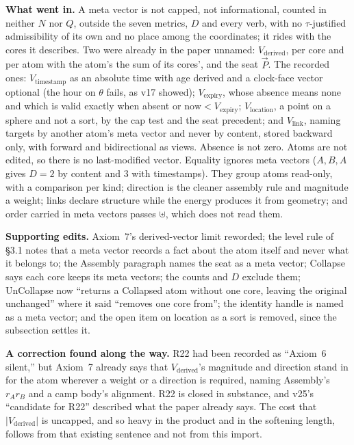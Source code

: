 \documentclass[11pt]{article}
\begin{document}
\textbf{What went in.} A meta vector is not capped, not informational,
counted in neither $N$ nor $Q$, outside the seven metrics, $D$ and every
verb, with no $\tau$-justified admissibility of its own and no place among
the coordinates; it rides with the cores it describes. Two were already in
the paper unnamed: $V_{\text{derived}}$, per core and per atom with the
atom's the sum of its cores', and the seat $\vec P$. The recorded ones:
$V_{\text{timestamp}}$ as an absolute time with age derived and a clock-face
vector optional (the hour on $\theta$ fails, as v17 showed);
$V_{\text{expiry}}$, whose absence means none and which is valid exactly
when absent or $\text{now}<V_{\text{expiry}}$; $V_{\text{location}}$, a point
on a sphere and not a sort, by the cap test and the seat precedent; and
$V_{\text{link}}$, naming targets by another atom's meta vector and never by
content, stored backward only, with forward and bidirectional as views.
Absence is not zero. Atoms are not edited, so there is no last-modified
vector. Equality ignores meta vectors ($A,B,A$ gives $D=2$ by content and
$3$ with timestamps). They group atoms read-only, with a comparison per
kind; direction is the cleaner assembly rule and magnitude a weight; links
declare structure while the energy produces it from geometry; and order
carried in meta vectors passes $\uplus$, which does not read them.

\textbf{Supporting edits.} Axiom~7's derived-vector limit reworded; the
level rule of \S3.1 notes that a meta vector records a fact about the atom
itself and never what it belongs to; the Assembly paragraph names the seat
as a meta vector; Collapse says each core keeps its meta vectors; the counts
and $D$ exclude them; UnCollapse now ``returns a Collapsed atom without one
core, leaving the original unchanged'' where it said ``removes one core
from''; the identity handle is named as a meta vector; and the open item on
location as a sort is removed, since the subsection settles it.

\textbf{A correction found along the way.} R22 had been recorded as
``Axiom~6 silent,'' but Axiom~7 already says that $V_{\text{derived}}$'s
magnitude and direction stand in for the atom wherever a weight or a
direction is required, naming Assembly's $r_Ar_B$ and a camp body's
alignment. R22 is closed in substance, and v25's ``candidate for R22''
described what the paper already says. The cost that $|V_{\text{derived}}|$
is uncapped, and so heavy in the product and in the softening length,
follows from that existing sentence and not from this import.
\end{document}
